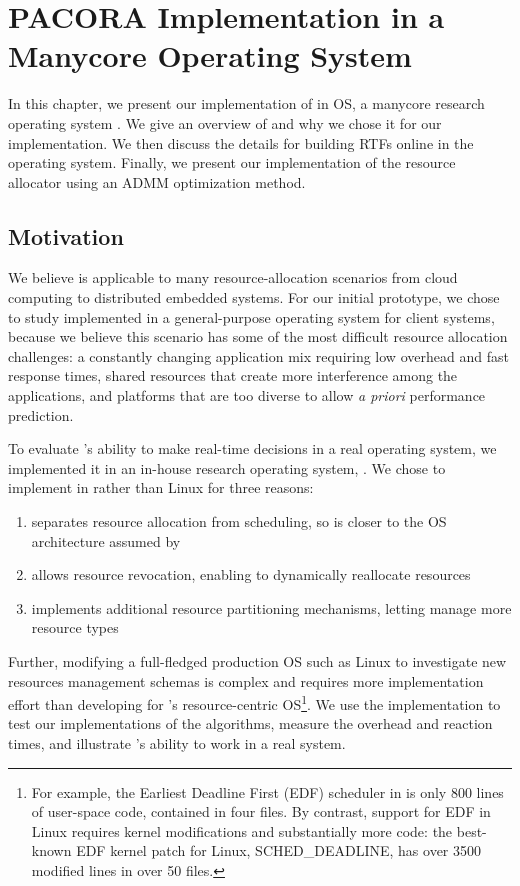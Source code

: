 \chapter{PACORA Implementation in a Manycore Operating System}\label{tess_design_ch}
In this chapter, we present our implementation of \pacora in \tess OS, a manycore research operating system \cite{tess_resource, tess, tess_dac, tess_audio, tess_gui}.  We give an overview of \tess and why we chose it for our implementation.  We then discuss the details for building RTFs online in the operating system.  Finally, we present our implementation of the resource allocator using an ADMM optimization method.



\section{Motivation}

We believe \pacora is applicable to many resource-allocation
scenarios from cloud computing to distributed embedded systems. For our initial prototype, we chose to study
\pacora implemented in a general-purpose operating system for client
systems, because we believe this scenario has some of the most
difficult resource allocation challenges: a constantly changing
application mix requiring low overhead and fast response times, shared
resources that create more interference among the applications, and
platforms that are too diverse to allow \emph{a priori} performance
prediction.

To evaluate \pacora's ability to make real-time decisions in a real operating system, we implemented it in an in-house research operating system, \tess. We chose to implement in \tess rather than Linux for three reasons:
 \begin{enumerate}\itemsep0pt \parskip0pt 
\item \tess separates resource allocation from scheduling, so is
  closer to the OS architecture assumed by \pacora
\item \tess allows resource revocation, enabling \pacora to dynamically reallocate resources
\item \tess implements additional resource partitioning mechanisms,
  letting \pacora manage  more resource types
\end{enumerate}

 Further, modifying a full-fledged production OS such as Linux to investigate new resources management schemas is complex and
 requires more implementation effort than developing for \tess's resource-centric OS\footnote{For example, the Earliest
 Deadline First (EDF) scheduler in \tess is only 800 lines of user-space code, contained in four files.  By contrast, support for
 EDF in Linux requires kernel modifications and substantially more code: the best-known EDF kernel patch for Linux, SCHED\_DEADLINE, has over 3500 modified lines in over 50 files.}.
We use the \tess implementation to test our implementations of the algorithms, measure the overhead and reaction times, and illustrate \pacora's ability to work in a real system. 

